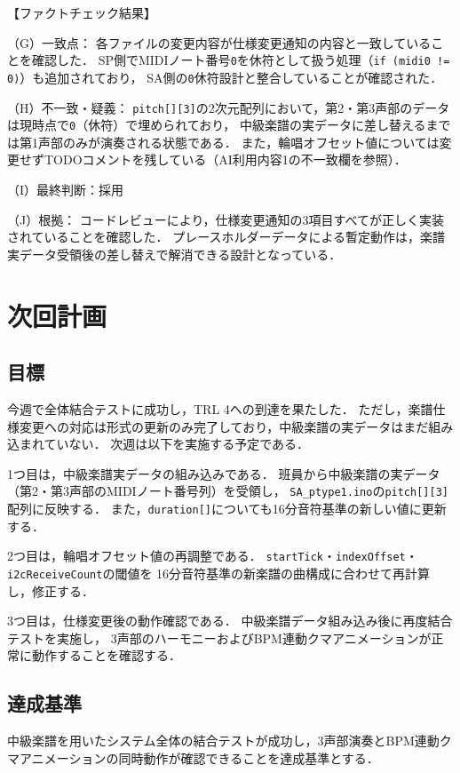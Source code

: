 \documentclass[uplatex,dvipdfmx]{jlreq}
\begin{document}
\begin{tcolorbox}[title = AI利用内容2：5ファイルへの仕様変更適用, arc=3mm, colback=white, breakable]
    【ファクトチェック結果】

     （G）一致点：
     各ファイルの変更内容が仕様変更通知の内容と一致していることを確認した．
     SP側でMIDIノート番号\texttt{0}を休符として扱う処理（\texttt{if (midi0 != 0)}）も追加されており，
     SA側の\texttt{0}休符設計と整合していることが確認された．

     （H）不一致・疑義：
     \texttt{pitch[][3]}の2次元配列において，第2・第3声部のデータは現時点で\texttt{0}（休符）で埋められており，
     中級楽譜の実データに差し替えるまでは第1声部のみが演奏される状態である．
     また，輪唱オフセット値については変更せずTODOコメントを残している（AI利用内容1の不一致欄を参照）．

     （I）最終判断：採用

     （J）根拠：
     コードレビューにより，仕様変更通知の3項目すべてが正しく実装されていることを確認した．
     プレースホルダーデータによる暫定動作は，楽譜実データ受領後の差し替えで解消できる設計となっている．

\end{tcolorbox}


\newpage
\section{次回計画}
\subsection{目標}
今週で全体結合テストに成功し，TRL 4への到達を果たした．
ただし，楽譜仕様変更への対応は形式の更新のみ完了しており，中級楽譜の実データはまだ組み込まれていない．
次週は以下を実施する予定である．

1つ目は，中級楽譜実データの組み込みである．
班員から中級楽譜の実データ（第2・第3声部のMIDIノート番号列）を受領し，
\texttt{SA\_ptype1.ino}の\texttt{pitch[][3]}配列に反映する．
また，\texttt{duration[]}についても16分音符基準の新しい値に更新する．

2つ目は，輪唱オフセット値の再調整である．
\texttt{startTick}・\texttt{indexOffset}・\texttt{i2cReceiveCount}の閾値を
16分音符基準の新楽譜の曲構成に合わせて再計算し，修正する．

3つ目は，仕様変更後の動作確認である．
中級楽譜データ組み込み後に再度結合テストを実施し，
3声部のハーモニーおよびBPM連動クマアニメーションが正常に動作することを確認する．

\subsection{達成基準}
中級楽譜を用いたシステム全体の結合テストが成功し，3声部演奏とBPM連動クマアニメーションの同時動作が確認できることを達成基準とする．
\end{document}
